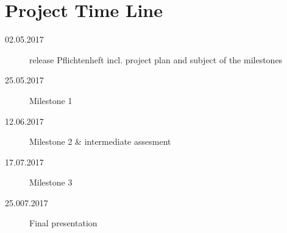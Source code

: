 \section{Project Time Line}

\begin{description}
  \item[02.05.2017] release Pflichtenheft incl. project plan and subject of the milestones
  \item[25.05.2017] Milestone 1
  \item[12.06.2017] Milestone 2 \& intermediate assesment
  \item[17.07.2017] Milestone 3
  \item[25.007.2017] Final presentation
\end{description}
